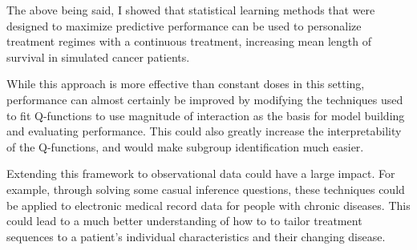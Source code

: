 \documentclass[12pt]{article}
\begin{document}
The above being said, I showed that statistical learning methods that were designed to maximize predictive performance can be used to personalize treatment regimes with a continuous treatment, increasing mean length of survival in simulated cancer patients.

While this approach is more effective than constant doses in this setting, performance can almost certainly be improved by modifying the techniques used to fit Q-functions to use magnitude of interaction as the basis for model building and evaluating performance. This could also greatly increase the interpretability of the Q-functions, and would make subgroup identification much easier. 

Extending this framework to observational data could have a large impact.  For example, through solving some casual inference questions, these techniques could be applied to electronic medical record data for people with chronic diseases. This could lead to a much better understanding of how to to tailor treatment sequences to a patient's individual characteristics and their changing disease.


{}
\printbibliography
\end{document}
